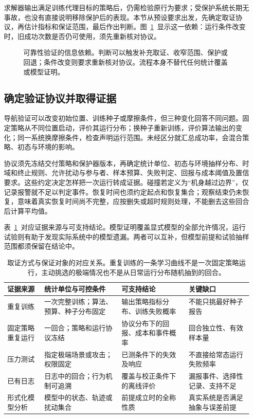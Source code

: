 求解器输出满足训练代理目标的策略后，仍需检验原行为要求；受保护系统长期无事故，也没有直接说明移除保护后的表现。本节从预设要求出发，先确定取证协议，再估计指标和保证范围，最后作出判断。图~\ref{fig:rl-trustworthy-validation}~显示这一依赖：运行条件改变时，旧成功次数是否仍可使用，须先重新核对协议。

\begin{figure}[t]
  \centering
  
  \caption{可靠性验证的信息依赖。判断可以触发补充取证、收窄范围、保护或回退；条件改变则要求重新核对协议。流程本身不替代任何统计覆盖或模型证明。}
  \label{fig:rl-trustworthy-validation}
\end{figure}

\subsection{确定验证协议并取得证据}
\label{sec:rl-trustworthy-protocol}

导航验证可以改变初始位置、训练种子或摩擦条件，但三种变化回答不同问题。固定策略从不同位置启动，评价其运行分布；换种子重新训练，评价算法输出的变化；同一系统换摩擦条件，检查声明运行范围。未经区分就汇总成功率，会混合策略、初态与环境的影响。

协议须先冻结交付策略和保护器版本，再确定统计单位、初态与环境抽样分布、时域和终止规则、允许扰动与参与者、样本预算、失败判定、回报与成本阈值及置信要求。这些约定决定怎样把一次运行转成证据。碰撞若定义为“机身越过边界”，仅记录报警就不足以判定事件。恢复时间也须约定起点和恢复集合；观察结束仍未恢复，意味着真实恢复时间尚不完整，应按删失或超时规则处理，不能删去这些回合后计算平均值。

表~\ref{tab:rl-trustworthy-evidence-sources}~对应证据来源与可支持结论。模型证明覆盖显式模型的全部允许情况，运行试验则有助于发现实际系统中的模型遗漏。两者可以互补，但模型前提和试验抽样范围都须保留在结论中。

\begin{table}[t]
  \centering
  \begin{tabularx}{\linewidth}{@{}>{\raggedright\arraybackslash}p{23mm}XXX@{}}
    \toprule
    证据来源 & 统计单位与可控条件 & 可支持结论 & 关键缺口 \\
    \midrule
    重复训练 & 一次完整训练；算法、预算、种子分布固定 & 输出策略指标分布、训练失败概率 & 不能只挑最好种子报告 \\
    固定策略重复运行 & 一回合；策略和运行协议冻结 & 协议分布下的回报、成本和事件概率 & 回合独立性、有效样本量 \\
    压力测试 & 指定极端场景或攻击；权限固定 & 已测条件下的失效及响应 & 不直接给常态运行失败频率 \\
    已有日志 & 日志中的回合；行为机制可追溯 & 覆盖与校正条件下的离线评价 & 漏报事件、选择性记录、支持不足 \\
    形式化模型分析 & 模型中的状态、轨迹或扰动集合 & 前提成立时的全称性质 & 真实系统是否满足抽象与误差前提 \\
    \bottomrule
  \end{tabularx}
  \caption{取证方式与保证对象的对应关系。重复训练的一条学习曲线不是一次固定策略运行，主动挑选的极端情况也不是从日常运行分布随机抽到的回合。}
  \label{tab:rl-trustworthy-evidence-sources}
\end{table}

